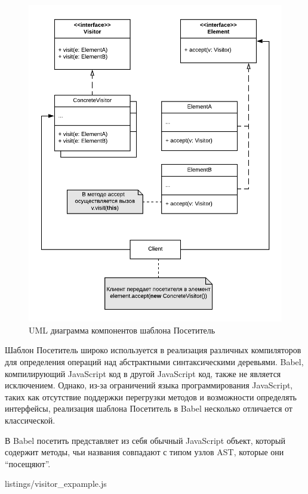 \documentclass[14pt, a4paper]{article}
\begin{document}
\begin{figure}[h!]
  \centering
  \includegraphics[scale=1.0]{img/visitor_uml.png}
  \caption{UML диаграмма компонентов шаблона Посетитель}
  \label{visitor_uml}
\end{figure}

Шаблон Посетитель широко используется в реализация различных компиляторов для определения операций над 
абстрактными синтаксическими деревьями. Babel, компилирующий JavaScript код в другой JavaScript код,
также не является исключением. Однако, из-за ограничений языка программирования JavaScript, таких как
отсутствие поддержки перегрузки методов и возможности определять интерфейсы, реализация шаблона Посетитель
в Babel несколько отличается от классической.

В Babel посетить представляет из себя обычный JavaScript объект, который содержит методы, чьи названия 
совпадают с типом узлов AST, которые они ``посещяют''.


  {listings/visitor_expample.js}
\end{document}
